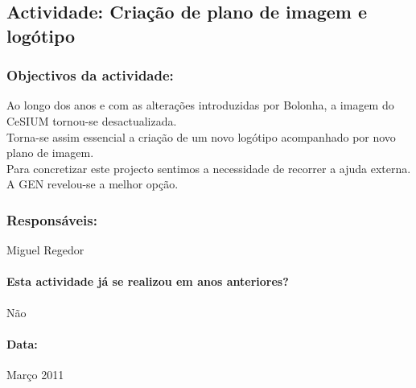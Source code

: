 \subsection*{Actividade: Criação de plano de imagem e logótipo} 

\subsubsection*{Objectivos da actividade:}
\indent Ao longo dos anos e com as alterações introduzidas por Bolonha, a imagem do CeSIUM tornou-se desactualizada.\\
\indent Torna-se assim essencial a criação de um novo logótipo acompanhado por novo plano de imagem.\\
\indent Para concretizar este projecto sentimos a necessidade de recorrer a ajuda externa. A GEN revelou-se a melhor opção.\\

\subsubsection*{Responsáveis:}
\begin{itemizedash}
  \item{Miguel Regedor}
\end{itemizedash}

\paragraph{Esta actividade já se realizou em anos anteriores?}
Não

\paragraph{Data:}
Março 2011 

